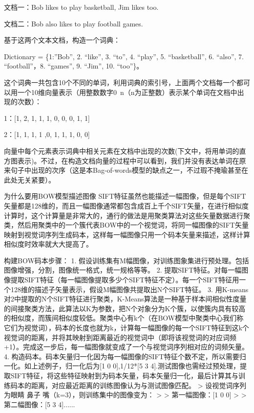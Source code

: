 \documentclass[10pt,a4paper]{ctexbook}
\begin{document}
文档一：Bob likes to play basketball, Jim likes too.

文档二：Bob also likes to play football games.

基于这两个文本文档，构造一个词典：

Dictionary = \{1:”Bob”, 2. “like”, 3. “to”, 4. “play”, 5. “basketball”, 6. “also”, 7. “football”，8. “games”, 9. “Jim”, 10. “too”\}。

这个词典一共包含10个不同的单词，利用词典的索引号，上面两个文档每一个都可以用一个10维向量表示（用整数数字0~n（n为正整数）表示某个单词在文档中出现的次数）：

1：[1, 2, 1, 1, 1, 0, 0, 0, 1, 1]

2：[1, 1, 1, 1 ,0, 1, 1, 1, 0, 0]

向量中每个元素表示词典中相关元素在文档中出现的次数(下文中，将用单词的直方图表示)。不过，在构造文档向量的过程中可以看到，我们并没有表达单词在原来句子中出现的次序（这是本Bag-of-words模型的缺点之一，不过瑕不掩瑜甚至在此处无关紧要）。

为什么要用BOW模型描述图像 SIFT特征虽然也能描述一幅图像，但是每个SIFT矢量都是128维的，而且一幅图像通常都包含成百上千个SIFT矢量，在进行相似度计算时，这个计算量是非常大的，通行的做法是用聚类算法对这些矢量数据进行聚类，然后用聚类中的一个簇代表BOW中的一个视觉词，将同一幅图像的SIFT矢量映射到视觉词序列生成码本，这样每一幅图像只用一个码本矢量来描述，这样计算相似度时效率就大大提高了。

构建BOW码本步骤：
1. 假设训练集有M幅图像，对训练图象集进行预处理。包括图像增强，分割，图像统一格式，统一规格等等。
2. 提取SIFT特征。对每一幅图像提取SIFT特征（每一幅图像提取多少个SIFT特征不定）。每一个SIFT特征用一个128维的描述子矢量表示，假设M幅图像共提取出N个SIFT特征。
3. 用K-means对2中提取的N个SIFT特征进行聚类，K-Means算法是一种基于样本间相似性度量的间接聚类方法，此算法以K为参数，把N个对象分为K个簇，以使簇内具有较高的相似度，而簇间相似度较低。聚类中心有k个（在BOW模型中聚类中心我们称它们为视觉词），码本的长度也就为k，计算每一幅图像的每一个SIFT特征到这k个视觉词的距离，并将其映射到距离最近的视觉词中（即将该视觉词的对应词频+1）。完成这一步后，每一幅图像就变成了一个与视觉词序列相对应的词频矢量。
4. 构造码本。码本矢量归一化因为每一幅图像的SIFT特征个数不定，所以需要归一化。如上述例子，归一化后为[1 0 0],1/12*[5 3 4].测试图像也需经过预处理，提取SIFT特征，将这些特征映射到为码本矢量，码本矢量归一化，最后计算其与训练码本的距离，对应最近距离的训练图像认为与测试图像匹配。 > 设视觉词序列为{眼睛 鼻子 嘴}（k=3），则训练集中的图像变为： > > 第一幅图像：[1 0 0] > > 第二幅图像：[5 3 4]......
\end{document}
